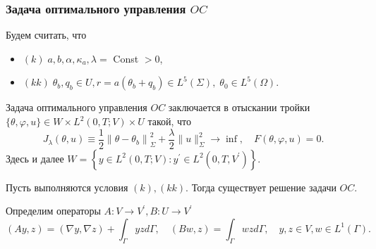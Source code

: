 \begin{frame}
    \frametitle{Задача оптимального управления $OC$}
    Будем считать, что
    \begin{itemize}
        \item $(k)\; a, b, \alpha, \kappa_{a}, \lambda=$ Const $>0$,
        \item $(kk)\; \theta_{b}, q_{b} \in U, r=a\left(\theta_{b}+q_{b}\right)
        \in L^{5}(\Sigma), \; \theta_{0} \in L^{5}(\Omega)$.
    \end{itemize}

    Задача оптимального управления $OC$ заключается в отыскании тройки
    $\{\theta, \varphi, u\} \in W \times L^{2}(0, T ; V) \times U$ такой, что
    \[
        J_{\lambda}(\theta, u) \equiv \frac{1}{2}\left\|\theta-
        \theta_{b}\right\|_{\Sigma}^{2}+
        \frac{\lambda}{2}\|u\|_{\Sigma}^{2}
        \rightarrow \inf, \quad F(\theta, \varphi, u)=0.
    \]
    Здесь и далее
    $
    W=\left\{y \in L^{2}(0, T ; V):y^{\prime}
    \in L^{2}\left(0, T, V^{\prime}\right)\right\}
    $.

    \begin{theorem}
        \label{th:2_3:1}
        Пусть выполняются условия $(k), (kk)$.
        Тогда существует решение задачи $OC$.
    \end{theorem}
    Определим операторы $A: V \rightarrow V^{\prime}, B: U \rightarrow V^{\prime}$
    \[
        (A y, z)=(\nabla y, \nabla z)+\int_{\Gamma} y z d \Gamma,
        \quad(B w, z)=\int_{\Gamma} w z d \Gamma,\quad y, z \in V, w \in L^{1}(\Gamma).
    \]

\end{frame}


